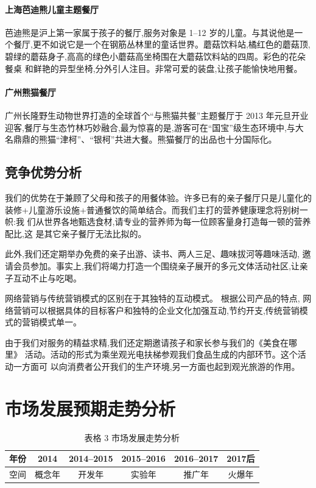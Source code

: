 \paragraph{上海芭迪熊儿童主题餐厅}
芭迪熊是沪上第一家属于孩子的餐厅,服务对象是 1--12 岁的儿童。与其说他是一
个餐厅,更不如说它是一个在钢筋丛林里的童话世界。蘑菇饮料站,橘红色的蘑菇顶,
碧绿的蘑菇身子,高高的绿色小蘑菇高坐椅围在大蘑菇饮料站的四周。彩色的花朵餐桌
和鲜艳的异型坐椅,分外引人注目。非常可爱的装盘,让孩子能愉快地用餐。

\paragraph{广州熊猫餐厅}
广州长隆野生动物世界打造的全球首个“与熊猫共餐”主题餐厅于 2013 年元旦开业
迎客,餐厅与生态竹林巧妙融合,最为惊喜的是,游客可在“国宝”级生态环境中,与大
名鼎鼎的熊猫“津柯”、“银柯”共进大餐。熊猫餐厅的出品也十分国际化。

\subsection{竞争优势分析}
我们的优势在于兼顾了父母和孩子的用餐体验。许多已有的亲子餐厅只是儿童化的
装修+儿童游乐设施+普通餐饮的简单结合。而我们主打的营养健康理念将别树一帜:我
们从世界各地甄选食材,请专业的营养师为每一位顾客量身打造每一顿的营养配比,这
是其它亲子餐厅无法比拟的。

此外,我们还定期举办免费的亲子出游、读书、两人三足、趣味拔河等趣味活动,
邀请会员参加。事实上,我们将竭力打造一个围绕亲子展开的多元文体活动社区,让亲
子互动不止与吃喝。

网络营销与传统营销模式的区别在于其独特的互动模式。 根据公司产品的特点,
网络营销可以根据具体的目标客户和独特的企业文化加强互动,节约开支,传统营销模
式的营销模式单一。

由于我们对服务的精益求精,我们还定期邀请孩子和家长参与我们的《美食在哪里》
活动。活动的形式为乘坐观光电扶梯参观我们食品生成的内部环节。这个活动一方面可
以向消费者公开我们的生产环境,另一方面也起到观光旅游的作用。

\section{市场发展预期走势分析}
\begin{table}[htbp]
\centering
\caption{表格 3 市场发展走势分析}
\begin{tabular}{|c|c|c|c|c|c|}
\hline
年份&2014&2014--2015&2015--2016&2016--2017&2017后\\
\hline
空间&概念年&开发年&实验年&推广年&火爆年\\
\hline
\end{tabular}
\end{table}

